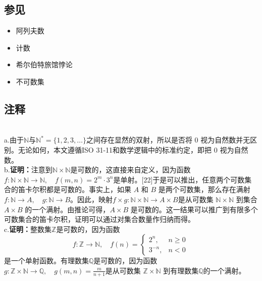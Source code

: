 \subsection{参见}
\begin{itemize}
\item 阿列夫数
\item 计数
\item 希尔伯特旅馆悖论
\item 不可数集
\end{itemize}
\subsection{注释}\\
a.由于$\mathbb{N}$与$\mathbb{N}^{*}=\{1,2,3,\dots\}$之间存在显然的双射，所以是否将 0 视为自然数并无区别。无论如何，本文遵循ISO 31-11和数学逻辑中的标准约定，即把 0 视为自然数。\\
b.\textbf{证明：}注意到$\mathbb{N} \times \mathbb{N}$是可数的，这直接来自定义，因为函数$f : \mathbb{N} \times \mathbb{N} \to \mathbb{N}, \quad f(m,n) = 2^{m}\cdot 3^{n}$是单射。[22]于是可以推出，任意两个可数集合的笛卡尔积都是可数的。事实上，如果 $A$ 和 $B$ 是两个可数集，那么存在满射$
f : \mathbb{N} \to A, \quad g : \mathbb{N} \to B$。因此，映射$f \times g : \mathbb{N} \times \mathbb{N} \to A \times B$是从可数集 $\mathbb{N} \times \mathbb{N}$ 到集合 $A \times B$ 的一个满射。由推论可得，$A \times B$ 是可数的。这一结果可以推广到有限多个可数集合的笛卡尔积，证明可以通过对集合数量作归纳而得。\\
c.\textbf{证明：}整数集$\mathbb{Z}$是可数的，因为函数
$$
f : \mathbb{Z} \to \mathbb{N}, \quad 
f(n) = 
\begin{cases} 
2^{n}, & n \geq 0 \\[6pt] 
3^{-n}, & n < 0 
\end{cases}~
$$
是一个单射函数。有理数集$\mathbb{Q}$是可数的，因为函数$g : \mathbb{Z} \times \mathbb{N} \to \mathbb{Q}, \quad g(m,n) = \frac{m}{n+1}$是从可数集 $\mathbb{Z} \times \mathbb{N}$ 到有理数集$\mathbb{Q}$的一个满射。

